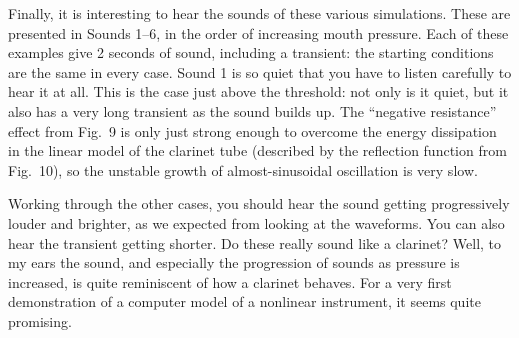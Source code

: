   Finally, it is interesting to hear the sounds of these various simulations. 
  These are presented in Sounds 1--6, in the order of increasing mouth 
  pressure. Each of these examples give 2 seconds of sound, including a 
  transient: the starting conditions are the same in every case. Sound 1 is so 
  quiet that you have to listen carefully to hear it at all. This is the case 
  just above the threshold: not only is it quiet, but it also has a very long 
  transient as the sound builds up. The ``negative resistance'' effect from 
  Fig.\ 9 is only just strong enough to overcome the energy dissipation in the 
  linear model of the clarinet tube (described by the reflection function from 
  Fig.\ 10), so the unstable growth of almost-sinusoidal oscillation is very 
  slow. 







  Working through the other cases, you should hear the sound getting 
  progressively louder and brighter, as we expected from looking at the 
  waveforms. You can also hear the transient getting shorter. Do these really 
  sound like a clarinet? Well, to my ears the sound, and especially the 
  progression of sounds as pressure is increased, is quite reminiscent of how a 
  clarinet behaves. For a very first demonstration of a computer model of a 
  nonlinear instrument, it seems quite promising. 

